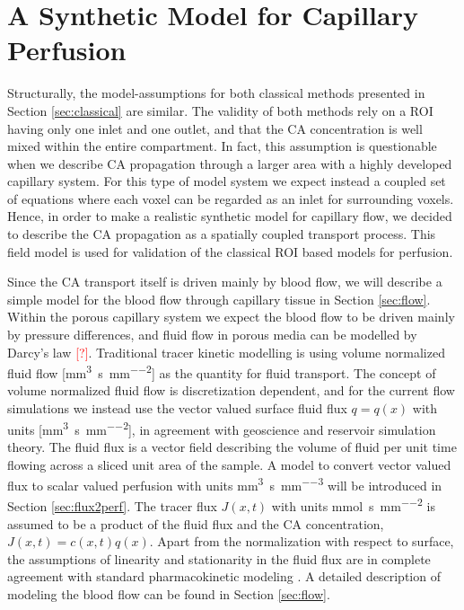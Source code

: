 \documentclass[paper=a4, fontsize=11pt,parskip=half,headings=small]{scrartcl}
\newcommand{\siq}{\milli\meter\cubed\per\second\per\milli\meter\squared}
\newcommand{\siP}{\milli\meter\cubed\per\second\per\milli\meter\cubed}
\newcommand{\siJ}{\milli\mol\per\second\per\milli\meter\squared}
\newcommand{\missingsource}{\textcolor{red}{[?]}}
\begin{document}
	\section{A Synthetic Model for Capillary Perfusion}\label{sec:synthetic}
	
	Structurally, the model-assumptions for both classical methods presented in Section \ref{sec:classical} are similar.
	The validity of both methods rely on a ROI having only one inlet and one outlet, and that the CA concentration is well mixed within the entire compartment.
	In fact, this assumption is questionable when we describe CA propagation through a larger area with a highly developed capillary system.
	For this type of model system we expect instead a coupled set of equations where each voxel can be regarded as an inlet for surrounding voxels.
	Hence, in order to make a realistic synthetic model for capillary flow, we decided to describe the CA propagation as a spatially coupled transport process. This field model is used for validation of the classical ROI based models for perfusion. 
	
	Since the CA transport itself is driven mainly by blood flow, we will describe a simple model for the blood flow through capillary tissue in Section \ref{sec:flow}.
	Within the porous capillary system we expect the blood flow to be driven mainly by pressure differences, and
	fluid flow in porous media can be modelled by Darcy's law \missingsource. Traditional tracer kinetic modelling is using volume normalized fluid flow [\si{\siq}] as the quantity for fluid transport. 
	The concept of volume normalized fluid flow is discretization dependent, and for the current flow simulations we instead use the vector valued surface fluid flux $q = q(x)$ with units [\si{\siq}], in agreement with geoscience and reservoir simulation theory.
	The fluid flux is a vector field describing the volume of fluid per unit time flowing across a sliced unit area of the sample.	
	A model to convert vector valued flux to scalar valued perfusion with units \si{\siP} will be introduced in Section \ref{sec:flux2perf}.
	The tracer flux $J(x,t)$ with units \si{\siJ} is assumed to be a product of the fluid flux and the CA concentration, $J(x,t) = c(x,t)q(x)$.
	Apart from the normalization with respect to surface, the assumptions of linearity and stationarity in the fluid flux are in complete agreement with standard pharmacokinetic modeling \cite{sourbron13}.
	A detailed description of modeling the blood flow can be found in Section \ref{sec:flow}.
	
\end{document}
